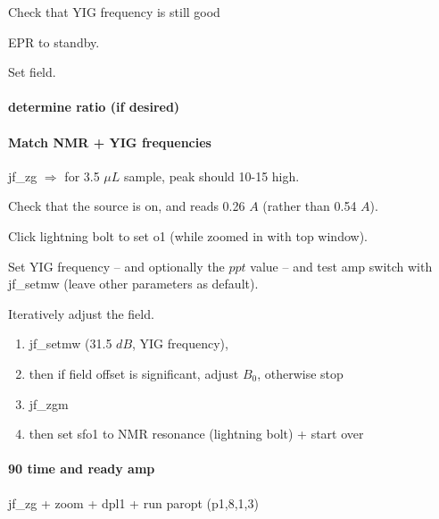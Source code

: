 Check that YIG frequency is still good



EPR to standby.

Set field.

\paragraph{determine ratio (if desired)}
\paragraph{ Match NMR + YIG frequencies}
jf\_zg $\Rightarrow$ for 3.5 $\mu L$ sample, peak should 10-15 high.

Check that the source is on, and reads 0.26 $A$ (rather than 0.54 $A$).

Click lightning bolt to set o1 (while zoomed in with top window).

Set YIG frequency -- and optionally the $ppt$ value -- and test amp switch with jf\_setmw (leave other parameters as default).

Iteratively adjust the field.
{\small
\begin{enumerate}
	\item jf\_setmw (31.5 $dB$, YIG frequency),
	\item then if field offset is significant, adjust $B_0$, otherwise stop
	\item jf\_zgm
	\item then set sfo1 to NMR resonance (lightning bolt) + start over
\end{enumerate}
}

\paragraph{90 time and ready amp}
jf\_zg + zoom + dpl1 + run paropt (p1,8,1,3)

